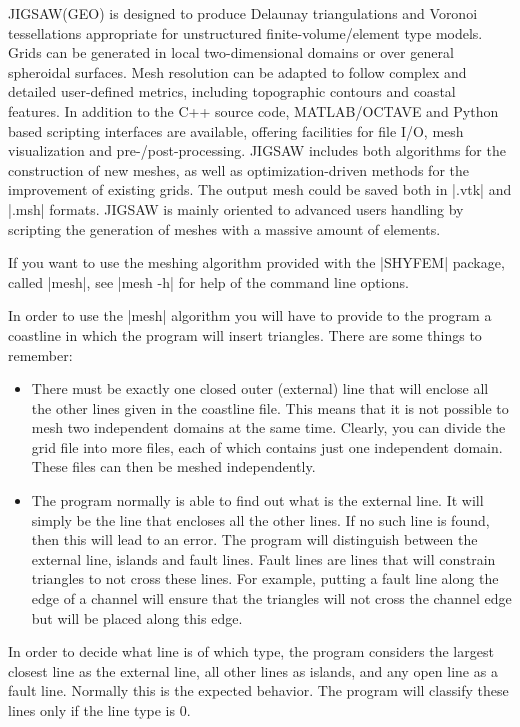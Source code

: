 JIGSAW(GEO) is designed to produce Delaunay triangulations and Voronoi tessellations appropriate for unstructured finite-volume/element type models. Grids can be generated in local two-dimensional domains or over general spheroidal surfaces. Mesh resolution can be adapted to follow complex and detailed user-defined metrics, including topographic contours and coastal features. In addition to the C++ source code, MATLAB/OCTAVE and Python based scripting interfaces are available, offering facilities for file I/O, mesh visualization and pre-/post-processing. JIGSAW includes both algorithms for the construction of new meshes, as well as optimization-driven methods for the improvement of existing grids. The output mesh could be saved both in |.vtk| and |.msh| formats. JIGSAW is mainly oriented to advanced users handling by scripting the generation of meshes with a massive amount of elements.


If you want to use the meshing algorithm provided with the |SHYFEM| package,
called |mesh|, see |mesh -h| for help of the command line options. 

In order to use the |mesh| algorithm you will have to provide to the program
a coastline in which the program will insert triangles. There are some
things to remember:
\begin{itemize}
    \item There must be exactly one closed outer (external) line that will enclose
all the other lines given in the coastline file. This means that it is
not possible to mesh two independent domains at the same time. Clearly,
you can divide the grid file into more files, each of which contains
just one independent domain. These files can then be meshed independently.

    \item The program normally is able to find out what is the external line. It
will simply be the line that encloses all the other lines. If no such line
is found, then this will lead to an error. The program will distinguish
between the external line, islands and fault lines. Fault lines are lines
that will constrain triangles to not cross these lines. For example,
putting a fault line along the edge of a channel will ensure that the
triangles will not cross the channel edge but will be placed along
this edge.
\end{itemize}

In order to decide what line is of which type, the program considers the
largest closest line as the external line, all other lines as islands, and
any open line as a fault line. Normally this is the expected behavior. The
program will classify these lines only if the line type is 0.

